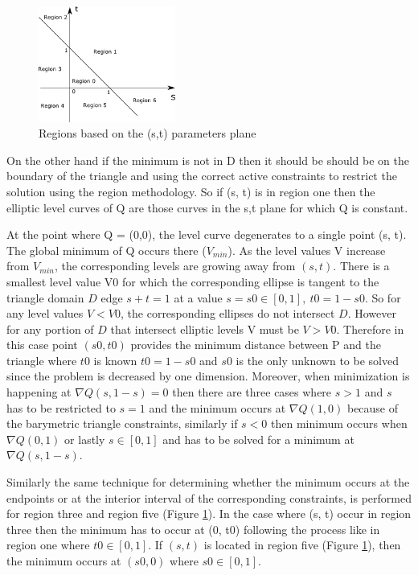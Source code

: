 \documentclass[times,12pt]{ACME2015article}
\begin{document}
\begin{figure}[!h]
\centering
\includegraphics[width=0.4\textwidth]{pt_regions} \protect\caption{\label{fig10} Regions based on the (s,t) parameters plane}
\end{figure} 

On the other hand if the minimum is not in D then it should be should be on the boundary of the triangle and using the correct active constraints to restrict the solution using the region methodology. So if (s, t) is in region one then the elliptic level curves of Q are those curves in the s,t plane for which Q is constant. 

At the point where Q = (0,0), the level curve degenerates to a single point (s, t). The global minimum of Q occurs there ($V_{min}$). As the level values V increase from $V_{min}$, the corresponding levels are growing away from $(s,t)$. There is a smallest level value V0 for which the corresponding ellipse is tangent to the triangle domain $D$ edge $s+t = 1$ at a value $s = s0 \in [0,1], \: t0 = 1 - s0$. So for any level values $V < V0$, the corresponding ellipses do not intersect $D$. However for any portion of $D$ that intersect elliptic levels V must be $V > V0$. Therefore in this case point $(s0, t0)$ provides the minimum distance between P and the triangle where $t0$ is known $t0 = 1 - s0$ and $s0$ is the only unknown to be solved since the problem is decreased by one dimension. Moreover, when minimization is happening at $\nabla Q(s, 1 − s) = 0$ then there are three cases where $s > 1$ and $s$ has to be restricted to $s=1$ and the minimum occurs at $\nabla Q(1, 0)$ because of the barymetric triangle constraints, similarly if $s < 0$ then minimum occurs when $\nabla Q(0,1)$ or lastly $s \in [0,1]$ and has to be solved for a minimum at $\nabla Q(s,1-s)$.

Similarly the same technique for determining whether the minimum occurs at the endpoints or at the interior interval of the corresponding constraints, is performed for region three and region five (Figure \ref{fig10}). In the case where (s, t) occur in region three then the minimum has to occur at (0, t0) following the process like in region one where $t0 \in [0, 1]$. If $(s, t)$ is located in region five (Figure \ref{fig10}), then the minimum occurs at $(s0, 0)$ where $s0 \in [0, 1]$.  
\end{document}
